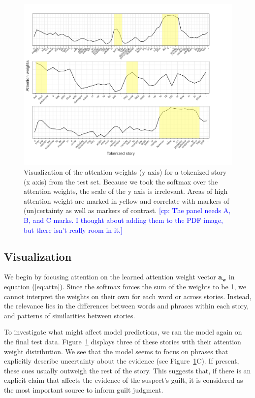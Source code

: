 \documentclass[11pt,a4paper]{article}
\newcommand{\cp}[1]{\textcolor{Blue}{[cp: #1]}}
\begin{document}
\begin{figure}[t]
  \centering
  \includegraphics[width=1\linewidth]{graphs/attention-marked.pdf}
  \caption{Visualization of the attention weights (y axis) for a tokenized story (x axis) from the test set. Because we took the softmax over the attention weights, the scale of the y axis is irrelevant. Areas of high attention weight are marked in yellow and correlate with markers of (un)certainty as well as markers of contrast. \cp{The panel needs A, B, and C marks. I thought about adding them to the PDF image, but there isn't really room in it.}}
  \label{fig:viz}
\end{figure}

\subsection{Visualization}

We begin by focusing attention on the learned attention weight vector $\mathbf{a_{w}}$ in equation (\ref{eq:attn}). Since the softmax forces the sum of the weights to be 1, we cannot interpret the weights on their own for each word or across stories. Instead, the relevance lies in the differences between words and phrases within each story, and patterns of similarities between stories.

To investigate what might affect model predictions, we ran the model again on the final test data. Figure~\ref{fig:viz} displays three of these stories with their attention weight distribution.
We see that the model seems to focus on phrases that explicitly describe uncertainty about the evidence (see Figure~\ref{fig:viz}C). If present, these cues usually outweigh the rest of the story. This suggests that, if there is an explicit claim that affects the evidence of the suspect's guilt, it is considered as the most important source to inform guilt judgment.
\end{document}
